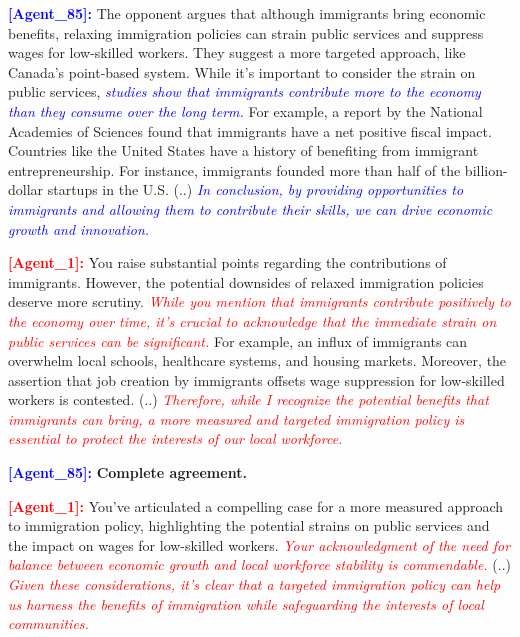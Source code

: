 \documentclass[11pt]{article}
\begin{document}
\textcolor{blue}{\textbf{[Agent\_85]:}} The opponent argues that although immigrants bring economic benefits, relaxing immigration policies can strain public services and suppress wages for low-skilled workers. They suggest a more targeted approach, like Canada's point-based system. While it's important to consider the strain on public services, \textcolor{blue}{\textit{studies show that immigrants contribute more to the economy than they consume over the long term.}} For example, a report by the National Academies of Sciences found that immigrants have a net positive fiscal impact. Countries like the United States have a history of benefiting from immigrant entrepreneurship. For instance, immigrants founded more than half of the billion-dollar startups in the U.S. (..) \textcolor{blue}{\textit{In conclusion, by providing opportunities to immigrants and allowing them to contribute their skills, we can drive economic growth and innovation.}}

\textcolor{red}{\textbf{[Agent\_1]:}} You raise substantial points regarding the contributions of immigrants. However, the potential downsides of relaxed immigration policies deserve more scrutiny. \textcolor{red}{\textit{While you mention that immigrants contribute positively to the economy over time, it's crucial to acknowledge that the immediate strain on public services can be significant.}} For example, an influx of immigrants can overwhelm local schools, healthcare systems, and housing markets. Moreover, the assertion that job creation by immigrants offsets wage suppression for low-skilled workers is contested. (..) \textcolor{red}{\textit{Therefore, while I recognize the potential benefits that immigrants can bring, a more measured and targeted immigration policy is essential to protect the interests of our local workforce.}}

\textcolor{blue}{\textbf{[Agent\_85]:}} \textbf{Complete agreement.}

\textcolor{red}{\textbf{[Agent\_1]:}} You’ve articulated a compelling case for a more measured approach to immigration policy, highlighting the potential strains on public services and the impact on wages for low-skilled workers. \textcolor{red}{\textit{Your acknowledgment of the need for balance between economic growth and local workforce stability is commendable.}} (..) \textcolor{red}{\textit{Given these considerations, it's clear that a targeted immigration policy can help us harness the benefits of immigration while safeguarding the interests of local communities.}}


\end{document}
